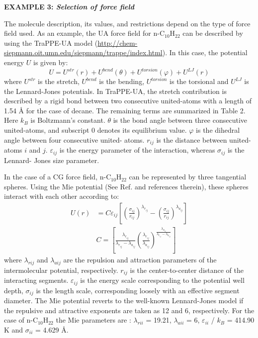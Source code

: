 \documentclass[9pt,tutorial]{livecoms}
\begin{document}
\begin{mdframed}[linewidth=0pt,backgroundcolor=LiveCoMSLightBlue!8,fontcolor=LiveCoMSDarkBlue!80!black]
  \textbf{EXAMPLE 3: \textit{Selection of force field}}

The molecule description, its values, and restrictions depend on the type of
force field used. As an example, the UA force field for
n-C$_{10}$H$_{22}$ can be described by using the TraPPE-UA model (\url{http://chem-siepmann.oit.umn.edu/siepmann/trappe/index.html}).
In this case, the potential energy $U$ is given by:
\begin{equation}
U=U^{str}\left(r\right)+U^{bend}\left(\theta\right)+U^{torsion}\left(\varphi\right)+U^{LJ}\left(r\right)
\end{equation}
where $U^{str}$ is the stretch, $U^{bend}$ is the bending,
$U^{torsion}$ is the torsional and $U^{LJ}$ is the
Lennard-Jones potentials. In TraPPE-UA, the stretch contribution is described
by a rigid bond between two consecutive united-atoms with a length of 1.54
\AA{} for the case of decane. The remaining terms are summarized in Table 2.
Here $k_{B}$ is Boltzmann's constant. ${\theta}$ is the bond angle between
three consecutive united-atoms, and subscript 0 denotes its equilibrium value.
${\varphi}$ is the dihedral angle between four consecutive united- atoms.
$r_{ij}$ is the distance between united-atoms $i$ and
$j$. ${\varepsilon}_{ij}$ is the energy parameter of the interaction,
whereas ${\sigma}_{ij}$ is the Lennard- Jones size parameter. 

In the case of a CG force field, n-C$_{10}$H$_{22}$ can be represented by three
tangential spheres. Using the Mie potential (See Ref. \citep{muller2014} and
references therein), these spheres interact with each other according to:
\begin{equation}
\begin{aligned}
  U\left(r\right) &= C\varepsilon_{ij}\left[\left(\frac{\sigma_{ij}}{r_{ij}}\right)^{\lambda_{r_{ij}}}-\left(\frac{\sigma_{ij}}{r_{ij}}\right)^{\lambda_{a_{ij}}}\right] \\
  & C = \left[\frac{\lambda_{r_{ij}}}{\lambda_{r_{ij}}-\lambda_{a_{ij}}}\left(\frac{\lambda_{r_{ij}}}{\lambda_{a_{ij}}}\right)^{\frac{\lambda_{a_{ij}}}{\lambda_{r_{ij}}-\lambda_{a_{ij}}}}\right]
\end{aligned}
\end{equation}
\ignorespacesafterend
where {${\lambda}$}$_{rij}$ and {${\lambda}$}$_{aij}$ are the repulsion and
attraction parameters of the intermolecular potential, respectively.
$r_{ij}$ is the center-to-center distance of the interacting segments.
${\varepsilon}_{ij}$ is the energy scale corresponding to the potential well
depth, ${\sigma}_{ij}$ is the length scale, corresponding loosely with an
effective segment diameter. The Mie potential reverts to the well-known
Lennard-Jones model if the repulsive and attractive exponents are taken as 12
and 6, respectively. For the case of n-C$_{10}$H$_{22}$ the Mie parameters are
\citep{mejia2014a}:
{${\lambda}$}$_{rii}$ = 19.21, {${\lambda}$}$_{aii}$ = 6,
${\varepsilon}_{ii}$ / $k_{B}$ = 414.90 K and ${\sigma}_{ii}$
= 4.629 \AA{}.


\end{mdframed}
\end{document}

